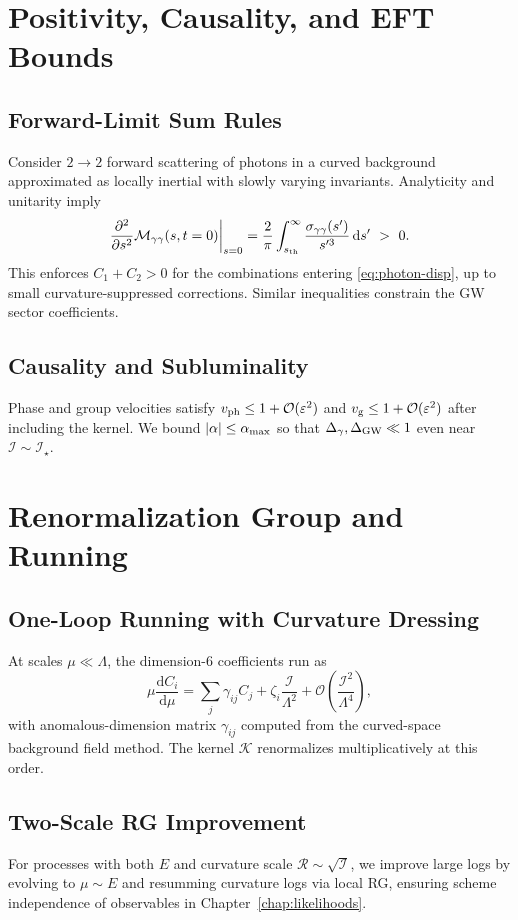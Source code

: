 \documentclass[12pt,a4paper,oneside]{scrbook}
\theoremstyle{definition}
\theoremstyle{remark}
\newcommand{\Order}{\mathcal{O}}
\newcommand{\dd}{\mathrm{d}}
\newcommand{\K}{\mathcal{K}}
\begin{document}
\chapter{Positivity, Causality, and EFT Bounds}
\label{chap:positivity}
\section{Forward-Limit Sum Rules}
\label{sec:sumrules}
Consider $2\to 2$ forward scattering of photons in a curved background approximated as locally inertial with slowly varying invariants. Analyticity and unitarity imply
\begin{equation}
\frac{\partial^2}{\partial s^2}\mathcal{M}_{\gamma\gamma}(s,t=0)\bigg|_{s=0}
= \frac{2}{\pi}\int_{s_{\rm th}}^\infty \frac{\sigma_{\gamma\gamma}(s')}{s'^3}\,\dd s' \ >\ 0.
\end{equation}
This enforces $C_1+C_2>0$ for the combinations entering \eqref{eq:photon-disp}, up to small curvature-suppressed corrections. Similar inequalities constrain the GW sector coefficients.
\section{Causality and Subluminality}
\label{sec:sublum}
Phase and group velocities satisfy $v_{\rm ph}\le 1+\Order(\varepsilon^2)$ and $v_{\rm g}\le 1+\Order(\varepsilon^2)$ after including the kernel. We bound $|\alpha|\le \alpha_{\rm max}$ so that $\Delta_\gamma,\Delta_{\rm GW}\ll 1$ even near $\mathcal{I}\sim \mathcal{I}_\star$.
\chapter{Renormalization Group and Running}
\label{chap:RG}
\section{One-Loop Running with Curvature Dressing}
\label{sec:RG1}
At scales $\mu\ll \Lambda$, the dimension-6 coefficients run as
\begin{equation}
\mu\frac{\dd C_i}{\dd \mu}= \sum_j \gamma_{ij} C_j + \zeta_i \frac{\mathcal{I}}{\Lambda^2} + \Order\!\left(\frac{\mathcal{I}^2}{\Lambda^4}\right),
\end{equation}
with anomalous-dimension matrix $\gamma_{ij}$ computed from the curved-space background field method. The kernel $\K$ renormalizes multiplicatively at this order.
\section{Two-Scale RG Improvement}
\label{sec:twoscale}
For processes with both $E$ and curvature scale $\mathcal{R}\sim\sqrt{\mathcal{I}}$, we improve large logs by evolving to $\mu\sim E$ and resumming curvature logs via local RG, ensuring scheme independence of observables in Chapter~\ref{chap:likelihoods}.
\end{document}
